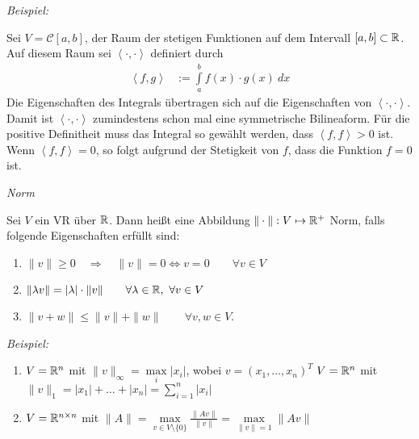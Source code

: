 \textit{Beispiel:}

    Sei $V = \mathcal{C}[a,b]$, der Raum der stetigen Funktionen auf dem Intervall $[a,b] \subset \mathbb{R}$.
    Auf diesem Raum sei $\left\langle \cdot , \cdot \right\rangle$ definiert durch
    \begin{align*}
            \left\langle f,g \right\rangle & := \int\limits_a^b f(x) \cdot g(x) \ dx
    \end{align*}
    Die Eigenschaften des Integrals übertragen sich auf die Eigenschaften von $\left\langle \cdot ,  \cdot \right\rangle$.
    Damit ist $\left\langle \cdot , \cdot \right\rangle$ zumindestens schon mal eine symmetrische Bilineaform.
    Für die positive Definitheit muss das Integral so gewählt werden, dass $\left\langle f, f \right\rangle > 0$ ist.
    Wenn $\left\langle f, f \right\rangle = 0$, so folgt aufgrund der Stetigkeit von $f$, dass die Funktion $f = 0$ ist.


\begin{mydef} \label{norm} \textit{Norm}

Sei $V$ ein VR über $\mathbb{R}$. Dann heißt eine Abbildung $\| \cdot \|: V \mapsto \mathbb{R}^{+}$ Norm, falls folgende Eigenschaften erfüllt sind:
\begin{enumerate}
    \item $\| v \| \geq 0 \quad \Rightarrow \quad \| v \| = 0 \Leftrightarrow v = 0 \qquad \forall v \in V$
    \item $\| \lambda v\| = |\lambda| \cdot \| v \| \qquad \forall \lambda \in \mathbb{R}, \ \forall v \in V$
    \item $\| v + w \| \leq \| v \| + \| w \| \qquad \forall v,w\in V$.
\end{enumerate}
\end{mydef}


\textit{Beispiel:}
\begin{enumerate}
    \item   $V = \mathbb{R}^n$ mit $\| v \|_{\infty} =\max\limits_{i} | x_i |$, wobei $v = (x_1, \ldots, x_n)^T$
            $V = \mathbb{R}^n$ mit $\| v \|_{1} = | x_1| + \ldots + | x_n | = \sum\limits_{i = 1}^n | x_i |$
    \item $V = \mathbb{R}^{n \times n}$ mit $\| A \| = \max\limits_{v \in V \setminus\{ 0 \}} \frac{\| Av \|}{\| v \|} = \max\limits_{\| v\| = 1} \| Av \|$
\end{enumerate}

